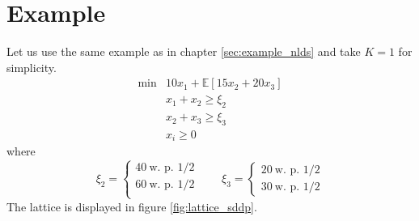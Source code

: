 \documentclass[12pt, openany]{report}
\newcommand{\E}{\mathbb{E}}
\theoremstyle{definition}
\begin{document}
\section{Example}
Let us use the same example as in chapter \ref{sec:example_nlds} and take $K=1$ for simplicity.
\begin{equation}
	\begin{aligned}
		\min &10x_1 + \E[15x_2+20x_3]\\
		& x_1+x_2\ge \xi_2\\
		& x_2+x_3\ge \xi_3\\
		& x_i \ge 0
	\end{aligned}
\end{equation}
where 
\begin{equation}
	\xi_2 = \begin{cases}
		40\ \text{w. p. } 1/2\\
		60\ \text{w. p. }1/2\\
	\end{cases}
	\qquad \xi_3 = \begin{cases}
		20\ \text{w. p. }1/2\\
		30\ \text{w. p. }1/2
	\end{cases}
\end{equation}
The lattice is displayed in figure \ref{fig:lattice_sddp}. 
\end{document}
